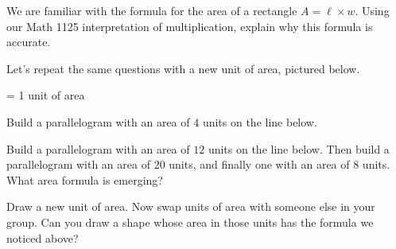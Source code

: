 \documentclass{ximera}
\begin{document}
\begin{problem}
 We are familiar with the formula for the area of a rectangle $A = \ell \times w$.  Using our Math 1125 interpretation of multiplication, explain why this formula is accurate.


\end{problem}


Let's repeat the same questions with a new unit of area, pictured below.

  = 1 unit of area


\begin{problem}
Build a parallelogram with an area of $4$ units on the line below.

\vspace{2.5 cm}

\end{problem}

\begin{problem}
Build a parallelogram with an area of $12$ units on the line below.  Then build a parallelogram with an area of 20 units, and finally one with an area of 8 units.  What area formula is emerging?

\vspace{6.5cm}

\end{problem}

\begin{problem}
Draw a new unit of area.  Now swap units of area with someone else in your group.  Can you draw a shape whose area in those units has the formula we noticed above?

\end{problem}
\end{document}
